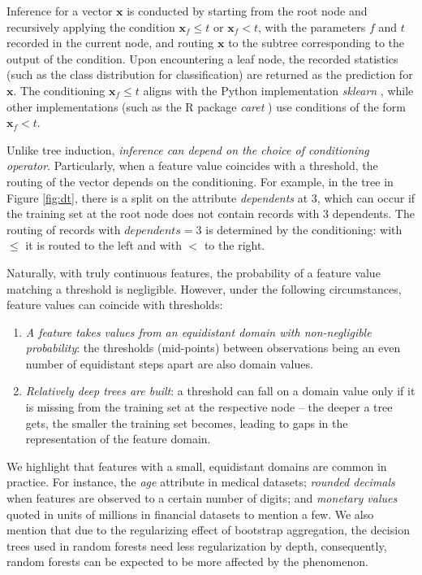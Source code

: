 \documentclass[sn-mathphys]{sn-jnl}%
\theoremstyle{thmstyleone}%
\theoremstyle{thmstyletwo}%
\theoremstyle{thmstylethree}%
\begin{document}
Inference for a vector $\mathbf{x}$ is conducted by starting from the root node and recursively applying the condition $\mathbf{x}_{f} \leq t$ or $\mathbf{x}_{f} < t$, with the parameters $f$ and $t$ recorded in the current node, and routing $\mathbf{x}$ to the subtree corresponding to the output of the condition. Upon encountering a leaf node, the recorded statistics (such as the class distribution for classification) are returned as the prediction for $\mathbf{x}$.
The conditioning $\mathbf{x}_f\leq t$ aligns with the Python implementation \emph{sklearn} \citep{sklearn}, while other implementations (such as the R package \emph{caret} \citep{caret}) use conditions of the form $\mathbf{x}_{f} < t$.

Unlike tree induction, \emph{inference can depend on the choice of conditioning operator}. Particularly, when a feature value coincides with a threshold, the routing of the vector depends on the conditioning. 
For example, in the tree in Figure \ref{fig:dt}, there is a split on the attribute \emph{dependents} at 3, which can occur if the training set at the root node does not contain records with 3 dependents. The routing of records with $dependents=3$ is determined by the conditioning: with $\leq$ it is routed to the left and with $<$ to the right.

Naturally, with truly continuous features, the probability of a feature value matching a threshold is negligible. However, under the following circumstances, feature values can coincide with thresholds:
\begin{enumerate}
\item \emph{A feature takes values from an equidistant domain with non-negligible probability}: the thresholds (mid-points) between observations being an even number of equidistant steps apart are also domain values.
\item \emph{Relatively deep trees are built}: a threshold can fall on a domain value only if it is missing from the training set at the respective node -- the deeper a tree gets, the smaller the training set becomes, leading to gaps in the representation of the feature domain.
\end{enumerate}
We highlight that features with a small, equidistant domains are common in practice. For instance, the \emph{age} attribute in medical datasets; \emph{rounded decimals} when features are observed to a certain number of digits; and \emph{monetary values} quoted in units of millions in financial datasets to mention a few.
We also mention that due to the regularizing effect of bootstrap aggregation, the decision trees used in random forests need less regularization by depth, consequently, random forests can be expected to be more affected by the phenomenon.
\end{document}
